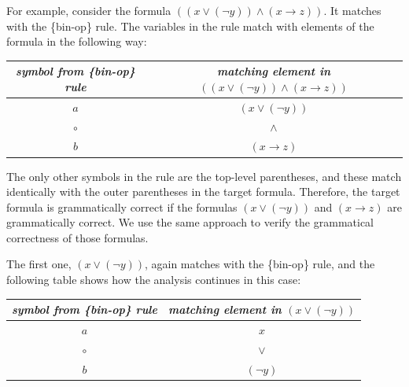 For example, consider the formula
$((x \vee (\neg y)) \wedge (x \rightarrow z))$.
It matches with the \{bin-op\} rule.
The variables in the rule match
with elements of the formula in the following way:

\vspace{2mm}
\begin{minipage}{\textwidth}
\begin{center}
\begin{spacing}{0.9}
\begin{tabular}{cc}
\hline
\emph{symbol from \{bin-op\} rule}      & \emph{matching element in} $((x \vee (\neg y)) \wedge (x \rightarrow z))$ \\
\hline
$a$                                     & $(x \vee (\neg y))$ \\
$\circ$                                 & $\wedge$ \\
$b$                                     & $(x \rightarrow z)$ \\
\end{tabular}
\end{spacing}
\end{center}
\end{minipage}

The only other symbols in the rule are the top-level parentheses, and these match identically with the outer parentheses in the target formula. Therefore, the target formula is grammatically correct if the formulas $(x \vee (\neg y))$ and $(x \rightarrow z)$  are grammatically correct. We use the same approach to verify the grammatical correctness of those formulas.

The first one, $(x \vee (\neg y))$,
again matches with the \{bin-op\} rule,
and the following table shows how the analysis continues in this case:

\vspace{2mm}
\begin{minipage}{\textwidth}
\begin{center}
\begin{spacing}{0.9}
\begin{tabular}{cc}
\hline
\emph{symbol from \{bin-op\} rule}      & \emph{matching element in}  $(x \vee (\neg y))$ \\
\hline
$a$                                     & $x$ \\
$\circ$                                 & $\vee$ \\
$b$                                     & $(\neg y)$ \\
\end{tabular}
\end{spacing}
\end{center}
\end{minipage}

